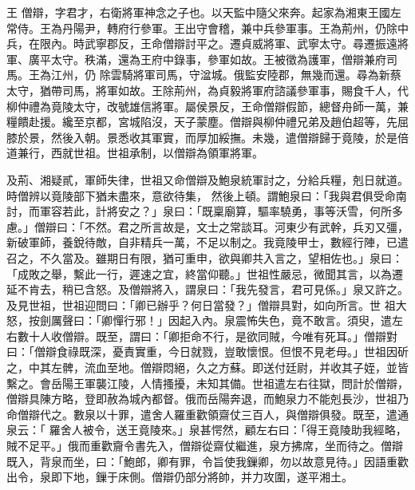 
\begin{pinyinscope}

 王
 僧辯，字君才，右衛將軍神念之子也。以天監中隨父來奔。起家為湘東王國左常侍。王為丹陽尹，轉府行參軍。王出守會稽，兼中兵參軍事。王為荊州，仍除中兵，在限內。時武寧郡反，王命僧辯討平之。遷貞威將軍、武寧太守。尋遷振遠將軍、廣平太守。秩滿，還為王府中錄事，參軍如故。王被徵為護軍，僧辯兼府司馬。王為江州，仍
 除雲騎將軍司馬，守湓城。俄監安陸郡，無幾而還。尋為新蔡太守，猶帶司馬，將軍如故。王除荊州，為貞毅將軍府諮議參軍事，賜食千人，代柳仲禮為竟陵太守，改號雄信將軍。屬侯景反，王命僧辯假節，總督舟師一萬，兼糧饋赴援。纔至京都，宮城陷沒，天子蒙塵。僧辯與柳仲禮兄弟及趙伯超等，先屈膝於景，然後入朝。景悉收其軍實，而厚加綏撫。未幾，遣僧辯歸于竟陵，於是倍道兼行，西就世祖。世祖承制，以僧辯為領軍將軍。



 及荊、湘疑貳，軍師失律，世祖又命僧辯及鮑泉統軍討之，分給兵糧，剋日就道。時僧辨以竟陵部下猶未盡來，意欲待集，
 然後上頓。謂鮑泉曰：「我與君俱受命南討，而軍容若此，計將安之？」泉曰：「既稟廟算，驅率驍勇，事等沃雪，何所多慮。」僧辯曰：「不然。君之所言故是，文士之常談耳。河東少有武幹，兵刃又彊，新破軍師，養銳待敵，自非精兵一萬，不足以制之。我竟陵甲士，數經行陣，已遣召之，不久當及。雖期日有限，猶可重申，欲與卿共入言之，望相佐也。」泉曰：「成敗之舉，繫此一行，遲速之宜，終當仰聽。」世祖性嚴忌，微聞其言，以為遷延不肯去，稍已含怒。及僧辯將入，謂泉曰：「我先發言，君可見係。」泉又許之。及見世祖，世祖迎問曰：「卿已辦乎？何日當發？」僧辯具對，如向所言。世
 祖大怒，按劍厲聲曰：「卿憚行邪！」因起入內。泉震怖失色，竟不敢言。須臾，遣左右數十人收僧辯。既至，謂曰：「卿拒命不行，是欲同賊，今唯有死耳。」僧辯對曰：「僧辯食祿既深，憂責實重，今日就戮，豈敢懷恨。但恨不見老母。」世祖因斫之，中其左髀，流血至地。僧辯悶絕，久之方蘇。即送付廷尉，并收其子姪，並皆繫之。會岳陽王軍襲江陵，人情搔擾，未知其備。世祖遣左右往獄，問計於僧辯，僧辯具陳方略，登即赦為城內都督。俄而岳陽奔退，而鮑泉力不能剋長沙，世祖乃命僧辯代之。數泉以十罪，遣舍人羅重歡領齋仗三百人，與僧辯俱發。既至，遣通泉云：「
 羅舍人被令，送王竟陵來。」泉甚愕然，顧左右曰：「得王竟陵助我經略，賊不足平。」俄而重歡齎令書先入，僧辯從齋仗繼進，泉方拂席，坐而待之。僧辯既入，背泉而坐，曰：「鮑郎，卿有罪，令旨使我鏁卿，勿以故意見待。」因語重歡出令，泉即下地，鏁于床側。僧辯仍部分將帥，并力攻圍，遂平湘土。




\end{pinyinscope}
